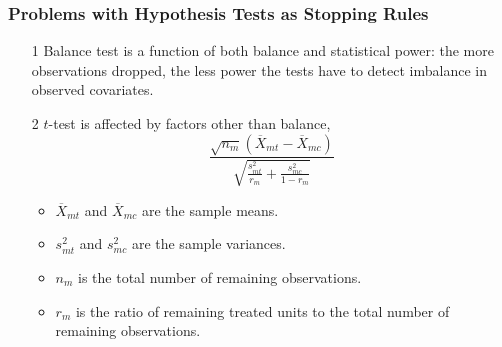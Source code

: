 \documentclass[trans]{beamer}
\begin{document}
\begin{frame}
  \frametitle{Problems with Hypothesis Tests as Stopping Rules}

  \begin{enumerate}
  \item[1] Balance test is a function of both balance and statistical
    power: the more observations dropped, the less power the tests
    have to detect imbalance in observed covariates.
  \item[2] $t$-test is affected by factors other than balance,
    $$\frac{\sqrt{n_m}(\overline{X}_{mt}-\overline{X}_{mc})}
    {\sqrt{\frac{s^2_{mt}}{r_m} + \frac{s^2_{mc}}{1-r_m}}}$$
    \begin{itemize}
    \item $\overline{X}_{mt}$ and $\overline{X}_{mc}$ are the sample
      means.
    \item $s^2_{mt}$ and $s^2_{mc}$ are the sample variances.
     \item $n_m$ is the total number of remaining observations.
     \item $r_m$ is the ratio of remaining treated units to the total
       number of remaining observations.
     \end{itemize}
   \end{enumerate}
\end{frame}
\end{document}
